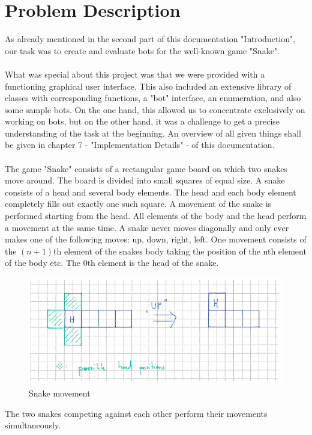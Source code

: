 \documentclass[a4paper,12pt]{article}
\begin{document}
\section{Problem Description}
As already mentioned in the second part of this documentation "Introduction",
our task was to create and evaluate bots for the well-known game "Snake".\\
\\What was special about this project was that we were provided with a functioning graphical user interface.
This also included an extensive library of classes with corresponding functions, a "bot" interface, an enumeration, 
and also some sample bots. On the one hand, this allowed us to concentrate exclusively on working on bots,
but on the other hand, it was a challenge to get a precise understanding of the task at the beginning.
An overview of all given things shall be given in chapter 7 - "Implementation Details" - of this documentation.\\
\\The game "Snake" consists of a rectangular game board on which two snakes move around.
The board  is divided into small squares of equal size.
A snake consists of a head and several body elements. 
The head and each body element completely fills out exactly one such square.
A movement of the snake is performed starting from the head.
All elements of the body and the head perform a movement at the same time. 
A snake never moves diagonally and only ever makes one of the following moves: up, 
down, right, left. One movement consists of the $(n+1)$th element of the snakes body 
taking the position of the nth element of the body etc. The $0$th element is the head of the snake.
\\
\begin{figure}[h]
    \centering
    \includegraphics[scale=0.8]{snakeForward.png}
    \caption{Snake movement}
\end{figure}
\newpage The two snakes competing against each other perform their movements simultaneously. 
\end{document}
